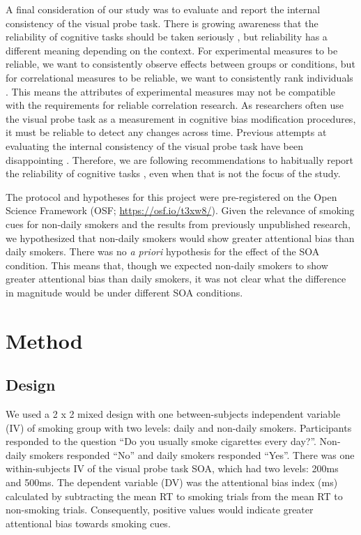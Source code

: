 \documentclass[empirical, authordate, issue]{jote-new-article}
\begin{document}
A final consideration of our study was to evaluate and report the internal consistency of the visual probe task. There is growing awareness that the reliability of cognitive tasks should be taken seriously \parencite{Parsons2019, Pennington2021}, but reliability has a different meaning depending on the context. For experimental measures to be reliable, we want to consistently observe effects between groups or conditions, but for correlational measures to be reliable, we want to consistently rank individuals \parencite{Hedge2018}. This means the attributes of experimental measures may not be compatible with the requirements for reliable correlation research. As researchers often use the visual probe task as a measurement in cognitive bias modification procedures, it must be reliable to detect any changes across time. Previous attempts at evaluating the internal consistency of the visual probe task have been disappointing \parencite{Ataya2012, Schmukle2005, Waechter2014}. Therefore, we are following recommendations to habitually report the reliability of cognitive tasks \parencite{Parsons2019}, even when that is not the focus of the study.

The protocol and hypotheses for this project were pre-registered on the Open Science Framework (OSF; \url{https://osf.io/t3xw8/}). Given the relevance of smoking cues for non-daily smokers and the results from previously unpublished research, we hypothesized that non-daily smokers would show greater attentional bias than daily smokers. There was no \emph{a priori} hypothesis for the effect of the SOA condition. This means that, though we expected non-daily smokers to show greater attentional bias than daily smokers, it was not clear what the difference in magnitude would be under different SOA conditions.

\section{Method}

\subsection{Design}

We used a 2 x 2 mixed design with one between-subjects independent variable (IV) of smoking group with two levels: daily and non-daily smokers. Participants responded to the question “Do you usually smoke cigarettes every day?”. Non-daily smokers responded “No” and daily smokers responded “Yes”. There was one within-subjects IV of the visual probe task SOA, which had two levels: 200ms and 500ms. The dependent variable (DV) was the attentional bias index (ms) calculated by subtracting the mean RT to smoking trials from the mean RT to non-smoking trials. Consequently, positive values would indicate greater attentional bias towards smoking cues.
\end{document}
